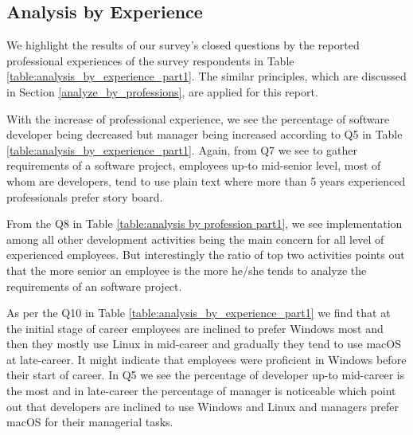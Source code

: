 \subsection{Analysis by Experience}

We highlight the results of our survey's closed questions by the reported professional experiences of the survey respondents in Table \ref{table:analysis_by_experience_part1}. The similar principles, which are discussed in Section \ref{analyze_by_professions}, are applied for this report.




With the increase of professional experience, we see the percentage of software developer being decreased but manager being increased according to Q5 in Table \ref{table:analysis_by_experience_part1}. Again, from Q7 we see to gather requirements of a software project, employees up-to mid-senior level, most of whom are developers, tend to use plain text where more than 5 years experienced professionals prefer story board.

From the Q8 in Table \ref{table:analysis by profession part1}, we see implementation among all other development activities being the main concern for all level of experienced employees. But interestingly the ratio of top two activities points out that the more senior an employee is the more he/she tends to analyze the requirements of an software project.

As per the Q10 in Table \ref{table:analysis_by_experience_part1} we find that at the initial stage of career employees are inclined to prefer Windows most and then they mostly use Linux in mid-career and gradually they tend to use macOS at late-career. It might indicate that employees were proficient in Windows before their start of career. In Q5 we see the percentage of developer up-to mid-career is the most and in late-career the percentage of manager is noticeable which point out that developers are inclined to use Windows and Linux and managers prefer macOS for their managerial tasks.

